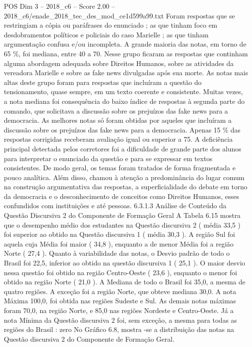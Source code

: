 \begin{textsample}{POS Dim 3 – 2018\_c6 – Score 2.00 – 2018\_c6/enade\_2018\_tec\_des\_mod\_ce1d599a99.txt}
Foram respostas que se restringiam a cópia ou paráfrases do enunciado ; as que tinham foco em desdobramentos políticos e policiais do caso Marielle ; as que tinham argumentação confusa e/ou incompleta.
A grande maioria das notas, em torno de 65 \%, foi mediana, entre 40 a 70.
Nesse grupo ficaram as respostas que continham alguma abordagem adequada sobre Direitos Humanos, sobre as atividades da vereadora Marielle e sobre as fake news divulgadas após sua morte.
As notas mais altas deste grupo foram para respostas que incluíram a questão do tensionamento, quase sempre, em um texto coerente e consistente.
Muitas vezes, a nota mediana foi consequência do baixo índice de respostas à segunda parte do comando, que solicitava a discussão sobre os prejuízos das fake news para a democracia.
As melhores notas só foram obtidas por aqueles que incluíram a discussão sobre os prejuízos das fake news para a democracia.
Apenas 15 \% das respostas corrigidas receberam avaliação igual ou superior a 75.
A deficiência principal detectada pelos corretores foi a dificuldade de grande parte dos alunos para interpretar o enunciado da questão e para se expressar em textos consistentes.
De modo geral, os temas foram tratados de forma fragmentada e pouco analítica.
Além disso, chamou à atenção a predominância do lugar comum na construção argumentativa das respostas, a superficialidade do debate em torno da democracia e o desconhecimento de conceitos como Direitos Humanos, esses confundidos com instituições e até pessoas. 6.3.1.3 Análise de Conteúdo da Questão Discursiva 2 do Componente de Formação Geral A Tabela 6.15 mostra que o desempenho médio dos estudantes na Questão discursiva 2 ( média 33,5 ) foi superior ao obtido na Questão discursiva 1 ( média 30,3 ).
A região Sul foi aquela cuja Média foi maior ( 34,8 ), enquanto a de menor Média foi a região Norte ( 27,4 ).
Quanto à variabilidade das notas, o Desvio padrão de todo o Brasil foi 22,5, inferior ao obtido na questão discursiva 1 ( 25,1 ).
O maior desvio nessa questão foi obtido na região Centro-Oeste ( 23,6 ), enquanto o menor foi obtido na região Norte ( 21,0 ).
A Mediana de todo o Brasil foi 35,0, a mesma de quatro regiões.
A exceção foi a região Norte, que obteve mediana 30,0.
A nota Máxima 100,0, foi obtida nas regiões Sudeste e Sul.
As demais notas máximas foram 70,0, na região Norte, e 85,0 nas regiões Nordeste e Centro-Oeste.
Já a nota Mínima da Questão discursiva 2 foi, sem exceção, a mesma para todas as regiões do Brasil : zero No Gráfico 6.8, mostra -se a distribuição das notas na Questão discursiva 2 do Componente de Formação Geral.

\end{textsample}
